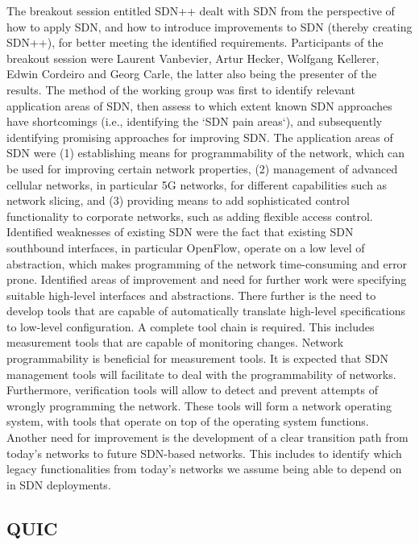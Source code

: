 The breakout session entitled SDN++ dealt with SDN from the perspective of how to apply SDN, and how to introduce improvements to SDN (thereby creating SDN++), for better meeting the identified requirements.
Participants of the breakout session were Laurent Vanbevier, Artur Hecker, Wolfgang Kellerer, Edwin Cordeiro and Georg Carle, the latter also being the presenter of the results.
The method of the working group was first to identify relevant application areas of SDN, then assess to which extent known SDN approaches have shortcomings (i.e., identifying the `SDN pain areas`), and subsequently identifying promising approaches for improving SDN.
The application areas of SDN were (1) establishing means for programmability of the network, which can be used for improving certain network properties, (2) management of advanced cellular networks, in particular 5G networks, for different capabilities such as network slicing, and (3) providing means to add sophisticated control functionality to corporate networks, such as adding flexible access control. 
Identified weaknesses of existing SDN were the fact that existing SDN southbound interfaces, in particular OpenFlow, operate on a low level of abstraction, which makes programming of the network time-consuming and error prone. 
Identified areas of improvement and need for further work were specifying suitable high-level interfaces and abstractions.
There further is the need to develop tools that are capable of automatically translate high-level specifications to low-level configuration. A complete tool chain is required.
This includes measurement tools that are capable of monitoring changes. Network programmability is beneficial for measurement tools.
It is expected that SDN management tools will facilitate to deal with the programmability of networks.
Furthermore, verification tools will allow to detect and prevent attempts of wrongly programming the network.    
These tools will form a network operating system, with tools that operate on top of the operating system functions.
Another need for improvement is the development of a clear transition path from today's networks to future SDN-based networks. This includes to identify which legacy functionalities from today's networks we assume being able to depend on in SDN deployments.
           



\subsection{QUIC}

